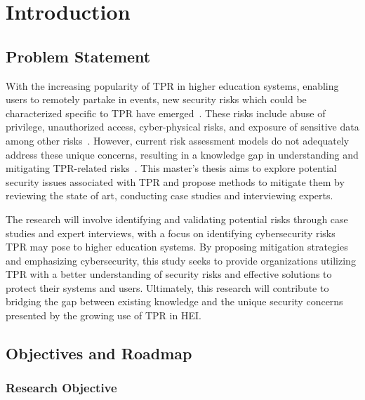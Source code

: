 
\newpage
\section{Introduction}


\subsection{Problem Statement}

With the increasing popularity of \ac{TPR} in higher education systems, enabling users to remotely partake in events, new security risks
which could be characterized specific to \ac{TPR} have emerged~\cite{acceptance_telepresence_robots_2022,
  cyber_security_issues_in_robotics_2021,robotics_cyber_security_2022,robot_security_review_2022}.
These risks include abuse of privilege, unauthorized access, cyber-physical risks, and exposure of sensitive data among other risks~\cite[
  120]{robotics_cyber_security_2022}.
However, current risk assessment models do not adequately address these unique concerns, resulting in a knowledge gap in understanding 
and mitigating TPR-related risks~\cite[]{robotics_cyber_security_2022}.
This master's thesis aims to explore potential security issues associated with \ac{TPR} and propose methods to mitigate them by
reviewing the state of art, conducting case studies and interviewing experts.

The research will involve identifying and validating potential risks through case studies and expert interviews, with a focus on identifying
cybersecurity risks \ac{TPR} may pose to higher education systems.
By proposing mitigation strategies and emphasizing cybersecurity, this study seeks to provide organizations utilizing \ac{TPR} with a
better
understanding of security risks and effective solutions to protect their systems and users.
Ultimately, this research will contribute to bridging the gap between existing knowledge and the unique security concerns presented by the
growing use of \ac{TPR} in \ac{HEI}.

\subsection{Objectives and Roadmap}\label{subsec:objectives-and-roadmap}


\subsubsection{Research Objective}


